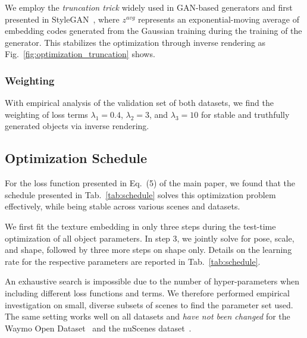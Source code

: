 We employ the \emph{truncation trick} widely used in GAN-based generators and first presented in StyleGAN~\cite{karras2019styleGAN}, where $z^{avg}$ represents an exponential-moving average of embedding codes generated from the Gaussian training during the training of the generator. This stabilizes the optimization through inverse rendering as Fig.~\ref{fig:optimization_truncation} shows.



\subsubsection{Weighting}
With empirical analysis of the validation set of both datasets, we find the weighting of loss terms $\lambda_1 = 0.4$, $\lambda_2 = 3$, and $\lambda_3 = 10$ for stable and truthfully generated objects via inverse rendering.




\subsection{Optimization Schedule}
For the loss function presented in Eq.~(5) of the main paper, we found that the schedule presented in Tab.~\ref{tab:schedule} solves this optimization problem effectively, while being stable across various scenes and datasets.

We first fit the texture embedding in only three steps during the test-time optimization of all object parameters. In step 3, we jointly solve for pose, scale, and shape, followed by three more steps on shape only. Details on the learning rate for the respective parameters are reported in Tab.~\ref{tab:schedule}.

An exhaustive search is impossible due to the number of hyper-parameters when including different loss functions and terms. We therefore performed empirical investigation on small, diverse subsets of scenes to find the parameter set used. The same setting works well on all datasets and \emph{have not been changed} for the Waymo Open Dataset~\cite{sun2020scalability} and the nuScenes dataset~\cite{caesar2020nuscenes}.

